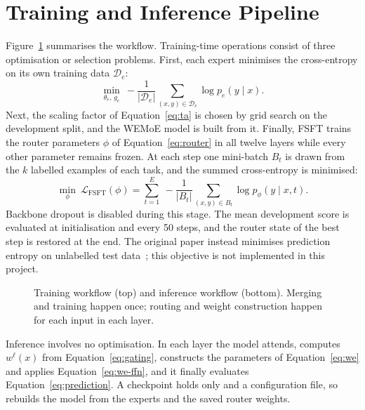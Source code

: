 \section{Training and Inference Pipeline}

Figure~\ref{fig:workflow} summarises the workflow. Training-time operations consist of three optimisation or selection problems. First, each expert minimises the cross-entropy on its own training data $\mathcal{D}_e$:
\begin{equation}
\min_{\theta_e,\,g_e}\ -\frac{1}{|\mathcal{D}_e|}\sum_{(x,y)\in\mathcal{D}_e}\log p_e(y\mid x).
\label{eq:expert-loss}
\end{equation}
Next, the scaling factor of Equation~\eqref{eq:ta} is chosen by grid search on the development split, and the WEMoE model is built from it. Finally, FSFT trains the router parameters $\phi$ of Equation~\eqref{eq:router} in all twelve layers while every other parameter remains frozen. At each step one mini-batch $B_t$ is drawn from the $k$ labelled examples of each task, and the summed cross-entropy is minimised:
\begin{equation}
\min_{\phi}\ \mathcal{L}_{\mathrm{FSFT}}(\phi)=\sum_{t=1}^{E}\ -\frac{1}{|B_t|}\sum_{(x,y)\in B_t}\log p_{\phi}(y\mid x,t).
\label{eq:fsft}
\end{equation}
Backbone dropout is disabled during this stage. The mean development score is evaluated at initialisation and every 50 steps, and the router state of the best step is restored at the end. The original paper instead minimises prediction entropy on unlabelled test data~\cite{tang2024wemoe}; this objective is not implemented in this project.

\begin{figure}[htbp]
  \centering
  \resizebox{\linewidth}{!}{}
  \caption{Training workflow (top) and inference workflow (bottom). Merging and training happen once; routing and weight construction happen for each input in each layer.}
  \label{fig:workflow}
\end{figure}

Inference involves no optimisation. In each layer the model attends, computes $w^{\ell}(x)$ from Equation~\eqref{eq:gating}, constructs the parameters of Equation~\eqref{eq:we} and applies Equation~\eqref{eq:we-ffn}, and it finally evaluates Equation~\eqref{eq:prediction}. A checkpoint holds only  and a configuration file, so  rebuilds the model from the experts and the saved router weights.


